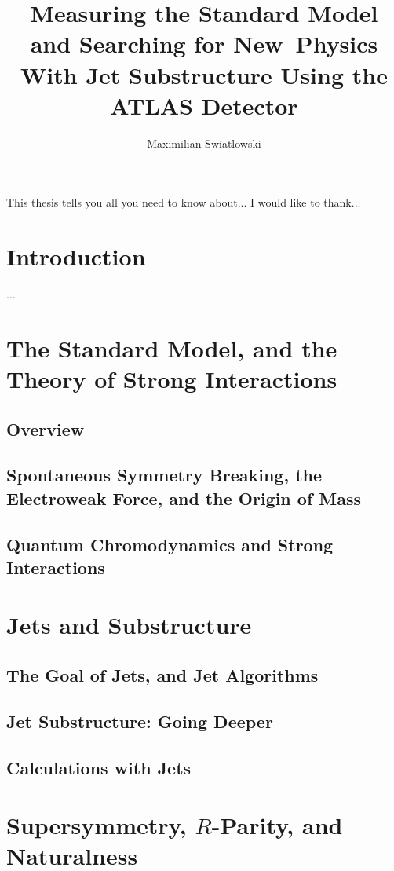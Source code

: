 \documentclass{report}
\begin{document}
\title{Measuring the Standard Model and Searching for New~Physics 
        With Jet Substructure Using the ATLAS Detector}
\author{Maximilian Swiatlowski}

 
\beforepreface
{}
    This thesis tells you all you need to know about...
    I would like to thank...
\afterpreface
 
\chapter{Introduction}
         ...

\chapter{The Standard Model, and the Theory of Strong Interactions}
\section{Overview}
\section{Spontaneous Symmetry Breaking, the Electroweak Force, and the Origin of Mass}
\section{Quantum Chromodynamics and Strong Interactions}

\chapter{Jets and Substructure}
\label{chapter:jets-and-substructure}
\section{The Goal of Jets, and Jet Algorithms}
\section{Jet Substructure: Going Deeper}
\section{Calculations with Jets}


\chapter{Supersymmetry, $R$-Parity, and Naturalness}
\end{document}
